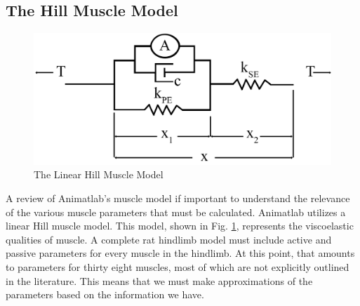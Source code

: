 \documentclass[runningheads,a4paper]{llncs}
\begin{document}
	\subsection{The Hill Muscle Model}
			\begin{figure}
				\centering
				\includegraphics[width=.7\textwidth]{hill1.png}
				\caption{The Linear Hill Muscle Model}
				\label{fig:hill}
			\end{figure}
		A review of Animatlab's muscle model if important to understand the relevance of the various muscle parameters that must be calculated. Animatlab utilizes a linear Hill muscle model. This model, shown in Fig. \ref{fig:hill}, represents the viscoelastic qualities of muscle. A complete rat hindlimb model must include active and passive parameters for every muscle in the hindlimb. At this point, that amounts to parameters for thirty eight muscles, most of which are not explicitly outlined in the literature. This means that we must make approximations of the parameters based on the information we have.
\end{document}
